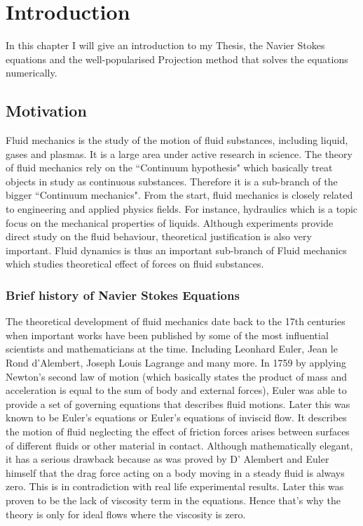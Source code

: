
\chapter{Introduction}
\label{chapter1}
In this chapter I will give an introduction to my Thesis, the Navier Stokes equations and the well-popularised Projection method that solves the equations numerically.

\section{Motivation}
Fluid mechanics is the study of the motion of fluid substances, including liquid, gases and plasmas. It is a large area under active research in science. The theory of fluid mechanics rely on the ``Continuum hypothesis" which basically treat objects in study as continuous substances. Therefore it is a sub-branch of the bigger ``Continuum mechanics". From the start, fluid mechanics is closely related to engineering and applied physics fields. For instance, hydraulics which is a topic focus on the mechanical properties of liquids. Although experiments provide direct study on the fluid behaviour, theoretical justification is also very important. Fluid dynamics is thus an important sub-branch of Fluid mechanics which studies theoretical effect of forces on fluid substances.\\

\subsection{Brief history of Navier Stokes Equations}
The theoretical development of fluid mechanics date back to the 17th centuries when important works have been published by some of the most influential scientists and mathematicians at the time. Including Leonhard Euler, Jean le Rond d'Alembert, Joseph Louis Lagrange and many more. In 1759 by applying Newton's second law of motion (which basically states the product of mass and acceleration is equal to the sum of body and external forces), Euler was able to provide a set of governing equations that describes fluid motions. Later this was known to be Euler's equations or Euler's equations of inviscid flow. It describes the motion of fluid neglecting the effect of friction forces arises between surfaces of different fluids or other material in contact. Although mathematically elegant, it has a serious drawback because as was proved by D' Alembert and Euler himself that the drag force acting on a body moving in a steady fluid is always zero. This is in contradiction with real life experimental results. Later this was proven to be the lack of viscosity term in the equations. Hence that's why the theory is only for ideal flows where the viscosity is zero. \\

